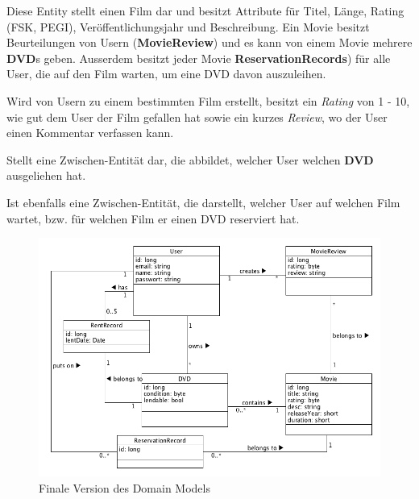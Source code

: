 Diese Entity stellt einen Film dar und besitzt Attribute für Titel, Länge, Rating (FSK, PEGI), Veröffentlichungsjahr und Beschreibung. Ein Movie besitzt Beurteilungen von Usern (\textbf{MovieReview}) und es kann von einem Movie mehrere \textbf{DVD}s geben. Ausserdem besitzt jeder Movie \textbf{ReservationRecords}) für alle User, die auf den Film warten, um eine DVD davon auszuleihen.

Wird von Usern zu einem bestimmten Film erstellt, besitzt ein \emph{Rating} von 1 - 10, wie gut dem User der Film gefallen hat sowie ein kurzes \emph{Review}, wo der User einen Kommentar verfassen kann.

Stellt eine Zwischen-Entität dar, die abbildet, welcher User welchen \textbf{DVD} ausgeliehen hat.

Ist ebenfalls eine Zwischen-Entität, die darstellt, welcher User auf welchen Film wartet, bzw. für welchen Film er einen DVD reserviert hat.

\begin{figure}[h]
	\centering
	\includegraphics[width=1\textwidth]{img/domain_model2.png}
	\caption{Finale Version des Domain Models}
	\label{fig:domainmodel2}
\end{figure}

